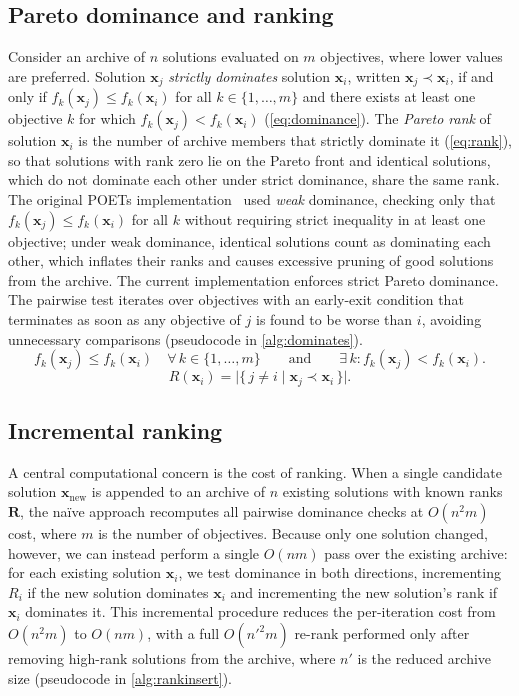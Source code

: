 \documentclass[12pt]{article}
\begin{document}
\subsection{Pareto dominance and ranking}\label{sec:dominance}
Consider an archive of $n$ solutions evaluated on $m$ objectives, where lower values are preferred.
Solution $\mathbf{x}_j$ \emph{strictly dominates} solution $\mathbf{x}_i$, written $\mathbf{x}_j \prec \mathbf{x}_i$, if and only if $f_k(\mathbf{x}_j) \leq f_k(\mathbf{x}_i)$ for all $k \in \{1,\ldots,m\}$ and there exists at least one objective $k$ for which $f_k(\mathbf{x}_j) < f_k(\mathbf{x}_i)$ (\cref{eq:dominance}).
The \emph{Pareto rank} of solution $\mathbf{x}_i$ is the number of archive members that strictly dominate it (\cref{eq:rank}), so that solutions with rank zero lie on the Pareto front and identical solutions, which do not dominate each other under strict dominance, share the same rank.
The original POETs implementation~\cite{Song2010,Bassen2016} used \emph{weak} dominance, checking only that $f_k(\mathbf{x}_j) \leq f_k(\mathbf{x}_i)$ for all $k$ without requiring strict inequality in at least one objective; under weak dominance, identical solutions count as dominating each other, which inflates their ranks and causes excessive pruning of good solutions from the archive.
The current implementation enforces strict Pareto dominance. The pairwise test iterates over objectives with an early-exit condition that terminates as soon as any objective of $j$ is found to be worse than $i$, avoiding unnecessary comparisons (pseudocode in \cref{alg:dominates}).
\begin{equation}\label{eq:dominance}
  f_k(\mathbf{x}_j) \leq f_k(\mathbf{x}_i) \quad \forall\, k \in \{1,\ldots,m\}
  \qquad\text{and}\qquad
  \exists\, k : f_k(\mathbf{x}_j) < f_k(\mathbf{x}_i).
\end{equation}
\begin{equation}\label{eq:rank}
  R(\mathbf{x}_i) = \bigl|\{\, j \neq i \mid \mathbf{x}_j \prec \mathbf{x}_i \,\}\bigr|.
\end{equation}

\subsection{Incremental ranking}\label{sec:incremental}
A central computational concern is the cost of ranking. When a single candidate solution $\mathbf{x}_{\text{new}}$ is appended to an archive of $n$ existing solutions with known ranks $\mathbf{R}$, the na\"ive approach recomputes all pairwise dominance checks at $O(n^2 m)$ cost, where $m$ is the number of objectives. Because only one solution changed, however, we can instead perform a single $O(nm)$ pass over the existing archive: for each existing solution $\mathbf{x}_i$, we test dominance in both directions, incrementing $R_i$ if the new solution dominates $\mathbf{x}_i$ and incrementing the new solution's rank if $\mathbf{x}_i$ dominates it. This incremental procedure reduces the per-iteration cost from $O(n^2 m)$ to $O(nm)$, with a full $O(n'^2 m)$ re-rank performed only after removing high-rank solutions from the archive, where $n'$ is the reduced archive size (pseudocode in \cref{alg:rankinsert}).
\end{document}
